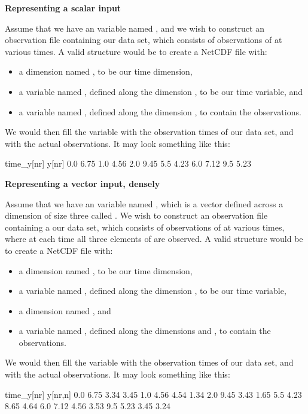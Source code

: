 \begin{example}
\noindent \textbf{Representing a scalar input}

Assume that we have an  variable named , and we wish to
construct an observation file containing our data set, which consists of
observations of  at various times. A valid structure would be to
create a NetCDF file with:
\begin{itemize}
\item a dimension named , to be our time dimension,
\item a variable named , defined along the dimension ,
  to be our time variable, and
\item a variable named , defined along the dimension , to
  contain the observations.
\end{itemize}
We would then fill the variable  with the observation times of
our data set, and  with the actual observations. It may look something
like this:

\begin{cmdcode}
time_y[nr]    y[nr]
       0.0     6.75
       1.0     4.56
       2.0     9.45
       5.5     4.23
       6.0     7.12
       9.5     5.23
\end{cmdcode}

\end{example}

\begin{example}
\noindent \textbf{Representing a vector input, densely}

Assume that we have an  variable named , which is a vector
defined across a dimension of size three called . We wish to construct
an observation file containing a our data set, which consists of observations
of  at various times, where at each time all three elements of
 are observed. A valid structure would be to create a NetCDF file
with:
\begin{itemize}
\item a dimension named , to be our time dimension,
\item a variable named , defined along the dimension ,
  to be our time variable,
\item a dimension named , and
\item a variable named , defined along the dimensions  and
  , to contain the observations.
\end{itemize}
We would then fill the variable  with the observation times of
our data set, and  with the actual observations. It may look something
like this:

\begin{cmdcode}
time_y[nr]     y[nr,n]
       0.0     6.75 3.34 3.45
       1.0     4.56 4.54 1.34
       2.0     9.45 3.43 1.65
       5.5     4.23 8.65 4.64
       6.0     7.12 4.56 3.53
       9.5     5.23 3.45 3.24
\end{cmdcode}

\end{example}

